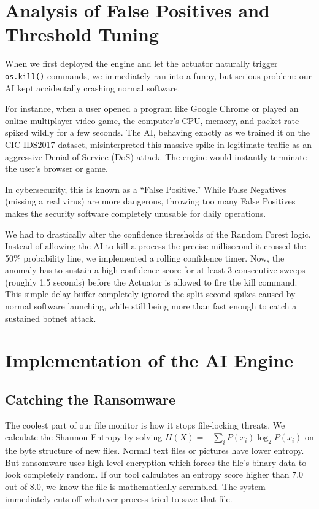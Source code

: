 \documentclass[conference]{IEEEtran}
\begin{document}
\section{Analysis of False Positives and Threshold Tuning}

When we first deployed the engine and let the actuator naturally trigger \texttt{os.kill()} commands, we immediately ran into a funny, but serious problem: our AI kept accidentally crashing normal software. 

For instance, when a user opened a program like Google Chrome or played an online multiplayer video game, the computer's CPU, memory, and packet rate spiked wildly for a few seconds. The AI, behaving exactly as we trained it on the CIC-IDS2017 dataset, misinterpreted this massive spike in legitimate traffic as an aggressive Denial of Service (DoS) attack. The engine would instantly terminate the user's browser or game. 

In cybersecurity, this is known as a ``False Positive.'' While False Negatives (missing a real virus) are more dangerous, throwing too many False Positives makes the security software completely unusable for daily operations. 

We had to drastically alter the confidence thresholds of the Random Forest logic. Instead of allowing the AI to kill a process the precise millisecond it crossed the 50\% probability line, we implemented a rolling confidence timer. Now, the anomaly has to sustain a high confidence score for at least 3 consecutive sweeps (roughly 1.5 seconds) before the Actuator is allowed to fire the kill command. This simple delay buffer completely ignored the split-second spikes caused by normal software launching, while still being more than fast enough to catch a sustained botnet attack.

\section{Implementation of the AI Engine}

\subsection{Catching the Ransomware}

The coolest part of our file monitor is how it stops file-locking threats. We calculate the Shannon Entropy by solving $H(X) = -\sum_{i} P(x_i) \log_2 P(x_i)$ on the byte structure of new files. Normal text files or pictures have lower entropy. But ransomware uses high-level encryption which forces the file's binary data to look completely random. If our tool calculates an entropy score higher than 7.0 out of 8.0, we know the file is mathematically scrambled. The system immediately cuts off whatever process tried to save that file.
\end{document}
